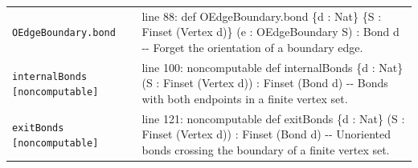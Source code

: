 \documentclass[10pt]{article}
\begin{document}
\begin{longtable}{>{\raggedright\arraybackslash}p{} >{\raggedright\arraybackslash}p{}}
\texttt{OEdgeBoundary.\allowbreak{}bond} & {\ttfamily\scriptsize line 88:\allowbreak{} def OEdgeBoundary.\allowbreak{}bond \{d :\allowbreak{} Nat\} \{S :\allowbreak{} Finset (\allowbreak{}Vertex d)\allowbreak{}\} (\allowbreak{}e :\allowbreak{} OEdgeBoundary S)\allowbreak{} :\allowbreak{} Bond d -\allowbreak{}-\allowbreak{} Forget the orientation of a boundary edge.\allowbreak{}} \\[0.45em]
\texttt{internalBonds [noncomputable]} & {\ttfamily\scriptsize line 100:\allowbreak{} noncomputable def internalBonds \{d :\allowbreak{} Nat\} (\allowbreak{}S :\allowbreak{} Finset (\allowbreak{}Vertex d)\allowbreak{})\allowbreak{} :\allowbreak{} Finset (\allowbreak{}Bond d)\allowbreak{} -\allowbreak{}-\allowbreak{} Bonds with both endpoints in a finite vertex set.\allowbreak{}} \\[0.45em]
\texttt{exitBonds [noncomputable]} & {\ttfamily\scriptsize line 121:\allowbreak{} noncomputable def exitBonds \{d :\allowbreak{} Nat\} (\allowbreak{}S :\allowbreak{} Finset (\allowbreak{}Vertex d)\allowbreak{})\allowbreak{} :\allowbreak{} Finset (\allowbreak{}Bond d)\allowbreak{} -\allowbreak{}-\allowbreak{} Unoriented bonds crossing the boundary of a finite vertex set.\allowbreak{}} \\[0.45em]
\end{longtable}
\end{document}
